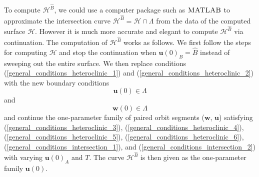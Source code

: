 \documentclass{ws-ijbc}
\begin{document}
To compute $\mathscr{H}^{\widehat{B}}$, we could use a computer package such as $\textsc{MATLAB}$ to approximate the intersection curve $\mathscr{H}^{\widehat{B}} = \mathscr{H} \cap \Lambda$ from the data of the computed surface $\mathscr{H}$.  However it is much more accurate and elegant to compute $\mathscr{H}^{\widehat{B}}$ via continuation.  The computation of $\mathscr{H}^{\widehat{B}}$ works as follows.  We first follow the steps for computing $\mathscr{H}$ and stop the continuation when $\mathbf{u}(0)_B = \widehat{B}$ instead of sweeping out the entire surface.  We then replace conditions (\ref{general_conditions_heteroclinic_1}) and (\ref{general_conditions_heteroclinic_2}) with the new boundary conditions
	\begin{equation}
		\mathbf{u}(0) \in \Lambda
		\label{general_conditions_intersection_1}
	\end{equation}
and
	\begin{equation}
		\mathbf{w}(0) \in \Lambda
		\label{general_conditions_intersection_2}
	\end{equation}	
and continue the one-parameter family of paired orbit segments ($\mathbf{w}$, $\mathbf{u}$) satisfying (\ref{general_conditions_heteroclinic_3}), (\ref{general_conditions_heteroclinic_4}), (\ref{general_conditions_heteroclinic_5}), (\ref{general_conditions_heteroclinic_6}), (\ref{general_conditions_intersection_1}), and (\ref{general_conditions_intersection_2}) with varying $\mathbf{u}(0)_A$ and $T$.  The curve $\mathscr{H}^{\widehat{B}}$ is then given as the one-parameter family $\mathbf{u}(0)$.
\end{document}
